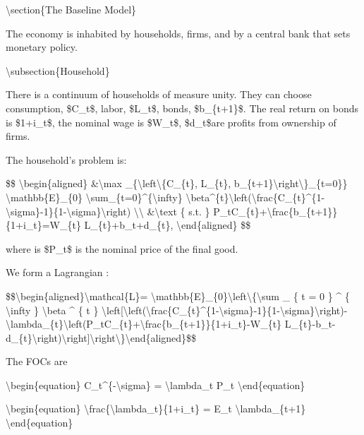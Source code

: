 \documentclass[10pt,math=newtx,citestyle=gb7714-2015,bibstyle=gb7714-2015]{elegantbook}
\begin{document}
	
	
	
	\textbackslash{}section\{The Baseline Model\}
	
	The economy is inhabited by households, firms, and by a central bank that sets monetary policy.
	
	\textbackslash{}subsection\{Household\}
	
	There is a continuum of households of measure unity. They can choose consumption, \$C\_t\$, labor, \$L\_t\$, bonds, \$b\_\{t+1\}\$. The real return on bonds is \$1+i\_t\$, the nominal wage is \$W\_t\$, \$d\_t\$are profits from ownership of firms.
	
	The household's problem is:
	
	\$\$
	\textbackslash{}begin\{aligned\}
	\&\textbackslash{}max \_\{\textbackslash{}left\textbackslash{}\{C\_\{t\}, L\_\{t\}, b\_\{t+1\}\textbackslash{}right\textbackslash{}\}\_\{t=0\}\} \textbackslash{}mathbb\{E\}\_\{0\} \textbackslash{}sum\_\{t=0\}\^{}\{\textbackslash{}infty\} \textbackslash{}beta\^{}\{t\}\textbackslash{}left(\textbackslash{}frac\{C\_\{t\}\^{}\{1-\textbackslash{}sigma\}-1\}\{1-\textbackslash{}sigma\}\textbackslash{}right) \textbackslash{}\textbackslash{}
	\&\textbackslash{}text \{ s.t. \} P\_tC\_\{t\}+\textbackslash{}frac\{b\_\{t+1\}\}\{1+i\_t\}=W\_\{t\} L\_\{t\}+b\_t+d\_\{t\},
	\textbackslash{}end\{aligned\}
	\$\$
	
	where is \$P\_t\$ is the nominal price of the final good.
	
	We form a Lagrangian :
	
	\$\$\textbackslash{}begin\{aligned\}\textbackslash{}mathcal\{L\}= \textbackslash{}mathbb\{E\}\_\{0\}\textbackslash{}left\textbackslash{}\{\textbackslash{}sum \_ \{ t = 0 \} \^{} \{ \textbackslash{}infty \} \textbackslash{}beta \^{} \{ t \} \textbackslash{}left[\textbackslash{}left(\textbackslash{}frac\{C\_\{t\}\^{}\{1-\textbackslash{}sigma\}-1\}\{1-\textbackslash{}sigma\}\textbackslash{}right)-\textbackslash{}lambda\_\{t\}\textbackslash{}left(P\_tC\_\{t\}+\textbackslash{}frac\{b\_\{t+1\}\}\{1+i\_t\}-W\_\{t\} L\_\{t\}-b\_t-d\_\{t\}\textbackslash{}right)\textbackslash{}right]\textbackslash{}right\textbackslash{}\}\textbackslash{}end\{aligned\}\$\$
	
	The FOCs are 
	
	\textbackslash{}begin\{equation\}
	C\_t\^{}\{-\textbackslash{}sigma\} = \textbackslash{}lambda\_t P\_t
	\textbackslash{}end\{equation\}
	
	\textbackslash{}begin\{equation\}
	\textbackslash{}frac\{\textbackslash{}lambda\_t\}\{1+i\_t\} = E\_t \textbackslash{}lambda\_\{t+1\}
	\textbackslash{}end\{equation\}
	
\end{document}
